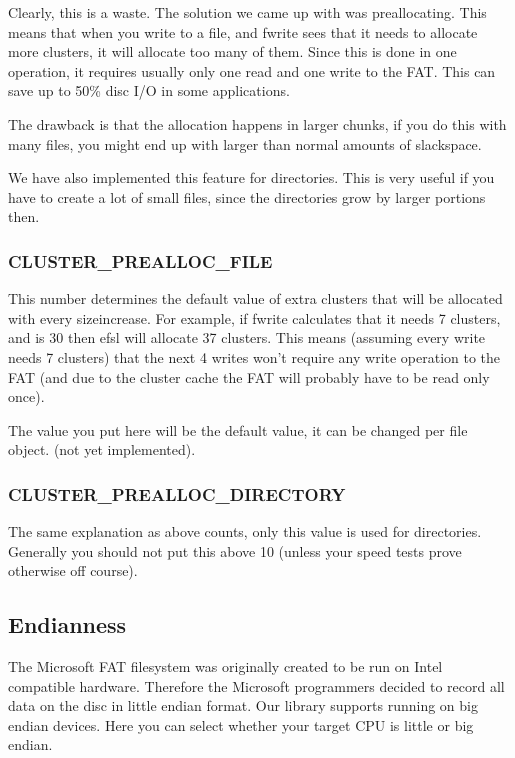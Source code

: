 Clearly, this is a waste. The solution we came up with was preallocating. This means
that when you write to a file, and fwrite sees that it needs to allocate more clusters,
it will allocate too many of them. Since this is done in one operation, it requires
usually only one read and one write to the FAT. This can save up to 50\% disc I/O
in some applications. 

The drawback is that the allocation happens in larger chunks, if you do this with
many files, you might end up with larger than normal amounts of slackspace.

We have also implemented this feature for directories. This is very useful if you
have to create a lot of small files, since the directories grow by larger portions
then.

\subsubsection*{CLUSTER\_PREALLOC\_FILE}
This number determines the default value of extra clusters that will be allocated
with every sizeincrease. For example, if fwrite calculates that it needs 7 clusters,
and  is 30 then efsl will allocate 37 clusters.
This means (assuming every write needs 7 clusters) that the next 4 writes won't 
require any write operation to the FAT (and due to the cluster cache the FAT will probably have to be read only once).

The value you put here will be the default value, it can be changed per file
object. (not yet implemented).

\subsubsection*{CLUSTER\_PREALLOC\_DIRECTORY}
The same explanation as above counts, only this value is used for directories.
Generally you should not put this above 10 (unless your speed tests prove otherwise
off course).

\subsection{Endianness}
The Microsoft FAT filesystem was originally created to be run on Intel compatible hardware.
Therefore the Microsoft programmers decided to record all data on the disc in little endian
format. Our library supports running on big endian devices. Here you can select whether your
target CPU is little or big endian.

